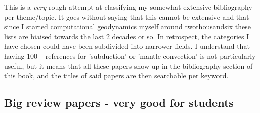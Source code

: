 This is a {\it very} rough attempt at classifying my somewhat extensive 
bibliography per theme/topic.
It goes without saying that this cannot be extensive and that since I 
started computational geodynamics myself around twothousandsix these lists are 
biaised towards the last 2 decades or so. 
In retrospect, the categories I have chosen could have been subdivided
into narrower fields. I understand that having 100+ references 
for 'subduction'  or 'mantle convection' is not particularly useful, 
but it means that all these papers show up in the bibliography section 
of this book, and the titles of said papers are then searchable per keyword.

\subsection{Big review papers - very good for students}

